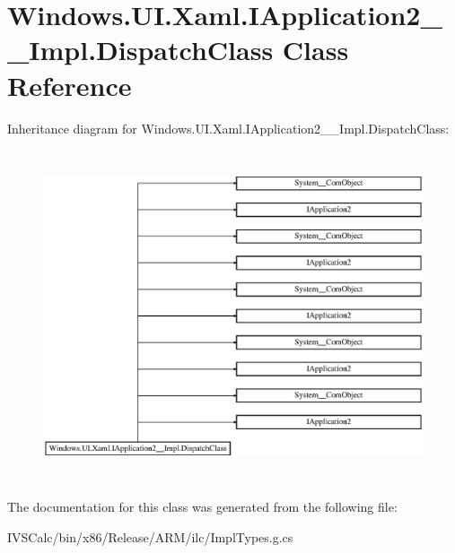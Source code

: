 \hypertarget{class_windows_1_1_u_i_1_1_xaml_1_1_i_application2_____impl_1_1_dispatch_class}{}\section{Windows.\+U\+I.\+Xaml.\+I\+Application2\+\_\+\+\_\+\+Impl.\+Dispatch\+Class Class Reference}
\label{class_windows_1_1_u_i_1_1_xaml_1_1_i_application2_____impl_1_1_dispatch_class}
Inheritance diagram for Windows.\+U\+I.\+Xaml.\+I\+Application2\+\_\+\+\_\+\+Impl.\+Dispatch\+Class\+:\begin{figure}[H]
\begin{center}
\leavevmode
\includegraphics[height=9.808917cm]{class_windows_1_1_u_i_1_1_xaml_1_1_i_application2_____impl_1_1_dispatch_class}
\end{center}
\end{figure}


The documentation for this class was generated from the following file\+:\begin{DoxyCompactItemize}
\item 
I\+V\+S\+Calc/bin/x86/\+Release/\+A\+R\+M/ilc/Impl\+Types.\+g.\+cs\end{DoxyCompactItemize}
